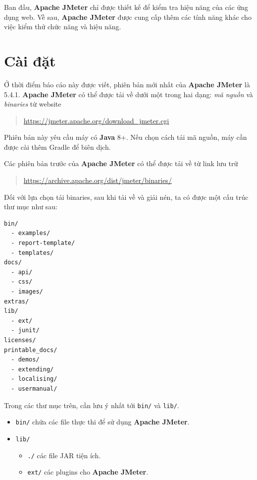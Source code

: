 \documentclass[10pt]{report}
\newcommand{\jmeter}{\textbf{Apache JMeter}}
\newcommand{\java}{\textbf{Java}}
\begin{document}
\par Ban đầu, \jmeter{} chỉ được thiết kế để kiểm tra hiệu năng của các ứng dụng web. Về sau, \jmeter{} được cung cấp thêm các tính năng khác cho việc kiểm thử chức năng và hiệu năng.

\section{Cài đặt}

\par Ở thời điểm báo cáo này được viết, phiên bản mới nhất của \jmeter{} là 5.4.1. \jmeter{} có thể được tải về dưới một trong hai dạng: \textit{mã nguồn} và \textit{binaries} từ website
\begin{quotation}
  \url{https://jmeter.apache.org/download_jmeter.cgi}
\end{quotation}

\par Phiên bản này yêu cầu máy có \java{} 8+. Nếu chọn cách tải mã nguồn, máy cần được cài thêm Gradle để biên dịch.
\bigskip
\par Các phiên bản trước của \jmeter{} có thể được tải về từ link lưu trữ
\begin{quotation}
  \url{https://archive.apache.org/dist/jmeter/binaries/}
\end{quotation}

\bigskip
\par Đối với lựa chọn tải binaries, sau khi tải về và giải nén, ta có được một cấu trúc thư mục như sau:

\begin{verbatim}
bin/
  - examples/
  - report-template/
  - templates/
docs/
  - api/
  - css/
  - images/
extras/
lib/
  - ext/
  - junit/
licenses/
printable_docs/
  - demos/
  - extending/
  - localising/
  - usermanual/
\end{verbatim}

\par Trong các thư mục trên, cần lưu ý nhất tới \texttt{bin/} và \texttt{lib/}.

\begin{itemize}[itemsep=0pt]
  \item \texttt{bin/} chứa các file thực thi để sử dụng \jmeter{}.
  \item \texttt{lib/}
      \begin{itemize}[itemsep=0pt]
          \item \texttt{./} các file JAR tiện ích.
          \item \texttt{ext/} các plugins cho \jmeter{}.
      \end{itemize}
\end{itemize}
\end{document}
